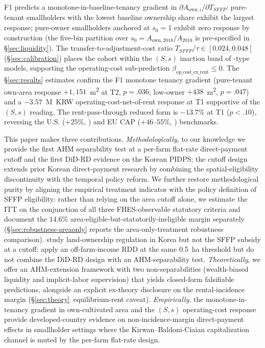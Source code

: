 \documentclass[12pt, a4paper]{article}
\begin{document}
F1 predicts a monotone-in-baseline-tenancy gradient in $\partial A_{\text{own},i} / \partial T_{SFFP}$: pure-tenant smallholders with the lowest baseline ownership share exhibit the largest response; pure-owner smallholders anchored at $s_0 = 1$ exhibit zero response by construction (the five-bin partition over $s_0 = A_{\text{own},2018}/A_{2018}$ is pre-specified in \S\ref{sec:liquidity}). The transfer-to-adjustment-cost ratio $T_{SFFP}/\tau \in [0.024, 0.048]$ (\S\ref{sec:calibration}) places the cohort within the $(S,s)$ inaction band of \citet{CaballeroEngel1999_lumpy}-type models, supporting the operating-cost sub-prediction $\beta_{\text{op\_cost\_ex\_rent}} \le 0$. The \S\ref{sec:results} estimates confirm the F1 monotone tenancy gradient (pure-tenant own-area response $+1{,}151$~m\textsuperscript{2} at T2, $p = .036$; low-owner $+438$~m\textsuperscript{2}, $p = .047$) and a $-3.57$~M~KRW operating-cost-net-of-rent response at T1 supportive of the $(S,s)$ reading. The rent-pass-through reduced form is $-13.7\%$ at T1 ($p < .10$), reversing the U.S. ($+25\%$, \citealp{Kirwan2009_rentcap}) and EU CAP ($+46$--$55\%$, \citealp{BaldoniCiaian2023_eucap}) benchmarks.

This paper makes three contributions. \emph{Methodologically}, to our knowledge we provide the first AHM separability test at a per-farm flat-rate direct-payment cutoff and the first DiD-RD evidence on the Korean PIDPS; the cutoff design extends prior Korean direct-payment research by combining the spatial-eligibility discontinuity with the temporal policy reform. We further restore methodological purity by aligning the empirical treatment indicator with the policy definition of SFFP eligibility: rather than relying on the area cutoff alone, we estimate the ITT on the conjunction of all three FHES-observable statutory criteria and document the $14.6\%$ area-eligible-but-statutorily-ineligible margin separately (\S\ref{sec:robustness-areaonly} reports the area-only-treatment robustness comparison). \citet{ChoiJodlowski2025_landreg} study land-ownership regulation in Korea but not the SFFP subsidy at a cutoff; \citet{ChoiMun2025_pidps_offinc} apply an off-farm-income RDD at the same 0.5~ha threshold but do not combine the DiD-RD design with an AHM-separability test. \emph{Theoretically}, we offer an AHM-extension framework with two non-separabilities (wealth-biased liquidity and implicit-labor supervision) that yields closed-form falsifiable predictions, alongside an explicit ex-theory disclosure on the rental-incidence margin (\S\ref{sec:theory}~equilibrium-rent caveat). \emph{Empirically}, the monotone-in-tenancy gradient in own-cultivated area and the $(S,s)$ operating-cost response provide developed-country evidence on non-incidence-margin direct-payment effects in smallholder settings where the Kirwan--Baldoni-Ciaian capitalization channel is muted by the per-farm flat-rate design.
\end{document}
